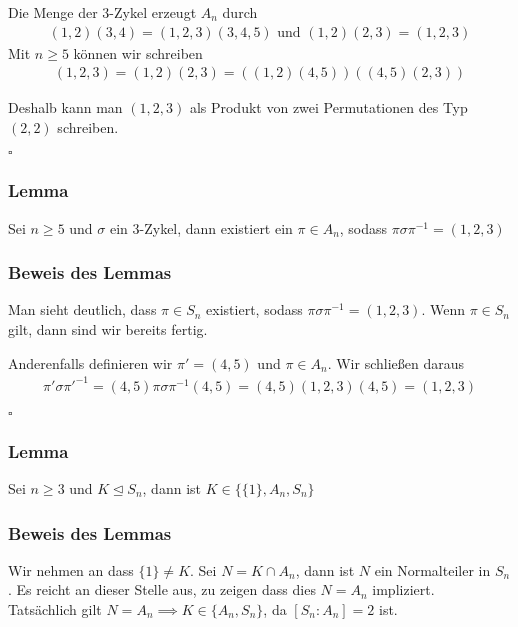 \documentclass[12pt, german]{article}
\newcommand{\bewiesen}{
	
	\begin{flushright}
		$\square$  \\
\end{flushright}}
\begin{document}
	Die Menge der $3$-Zykel erzeugt $A_n$ durch 
	\begin{align*}
		(1,2)(3,4) = (1,2,3)(3,4,5) \text{ und } (1,2)(2,3) = (1,2,3)
	\end{align*}
	Mit $n\geq 5$ können wir schreiben 
	\begin{align*}
		(1,2, 3) = (1,2)(2,3) =((1,2)(4,5))((4,5)(2,3))
	\end{align*}
	
	Deshalb kann man $(1,2,3)$ als Produkt von zwei Permutationen des Typ $(2,2)$ schreiben.
	\bewiesen
	
	\subsubsection{Lemma}
	Sei $n \geq 5$ und $\sigma$ ein $3$-Zykel, dann existiert ein $\pi \in A_n$, sodass $\pi\sigma\pi^{-1} = (1,2,3)$
	
	\subsubsection{Beweis des Lemmas}
	Man sieht deutlich, dass $\pi \in S_n$ existiert, sodass $\pi\sigma\pi^{-1} = (1,2,3)$. 
	Wenn $\pi \in S_n$ gilt, dann sind wir bereits fertig. 
	\newline
	
	Anderenfalls definieren wir $\pi' = (4,5)$ und $\pi \in A_n$.  Wir schließen daraus 
	\begin{align*}
		\pi'\sigma\pi'^{-1} = (4,5)\pi\sigma\pi^{-1}(4,5) = (4,5)(1,2,3)(4,5) = (1,2,3)
	\end{align*}
	\bewiesen
	
	\subsubsection{Lemma}
	Sei $n \geq 3$ und $K \trianglelefteq S_n$, dann ist $K \in \{ \{1\}, A_n, S_n\}$
	
	\subsubsection{Beweis des Lemmas}
	Wir nehmen an dass $\{1\} \not = K$. Sei $N= K \cap A_n$, dann ist $N$ ein Normalteiler in $S_n$. Es reicht an dieser Stelle aus, zu zeigen dass dies $N=A_n$ impliziert. \\ 
	Tatsächlich gilt $N = A_n \implies K \in \{ A_n, S_n\}$, da $[S_n : A_n] = 2$ ist.
	\newline
	
\end{document}
